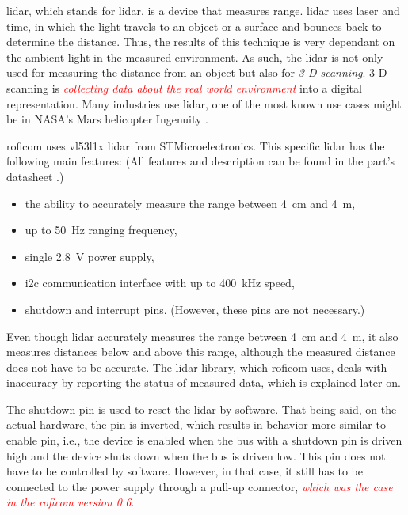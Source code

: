 \documentclass[
  digital,     %
  oneside,     %
  nosansbold,  %
  nocolorbold, %
  lof,         %
  lot,         %
]{fithesis4}
\newcommand{\TODO}[1]{\textcolor{red}{\textit{#1}}}
\begin{document}
\acrshort{lidar}, which stands for \acrlong{lidar}, is a device that measures range. \acrshort{lidar} uses laser and time, in which the light travels to an object or a surface and bounces back to determine the distance. Thus, the results of this technique is very dependant on the ambient light in the measured environment. As such, the \acrshort{lidar} is not only used for measuring the distance from an object but also for \emph{3-D scanning}. 3-D scanning is \TODO{collecting data about the real world environment} into a digital representation. Many industries use \acrshort{lidar}, one of the most known use cases might be in NASA's Mars helicopter Ingenuity \cite{garmin-lidar}.

\acrshort{roficom} uses \gls{vl53l1x} \acrshort{lidar} from STMicroelectronics. This specific \acrshort{lidar} has the following main features: (All features and description can be found in the part's datasheet \cite{vl53l1x}.)

\begin{itemize}
    \item the ability to accurately measure the range between \qty{4}{\centi\metre} and \qty{4}{\metre},
    \item up to \qty{50}{\hertz} ranging frequency,
    \item single \qty{2.8}{\volt} power supply,
    \item \acrshort{i2c} communication interface with up to \qty{400}{\kilo\hertz} speed,
    \item shutdown and interrupt pins. (However, these pins are not necessary.)
\end{itemize}

Even though \acrshort{lidar} accurately measures the range between \qty{4}{\centi\metre} and \qty{4}{\metre}, it also measures distances below and above this range, although the measured distance does not have to be accurate. The lidar library, which \acrshort{roficom} uses, deals with inaccuracy by reporting the status of measured data, which is explained later on.

The shutdown pin is used to reset the \acrshort{lidar} by software. That being said, on the actual hardware, the pin is inverted, which results in behavior more similar to enable pin, i.e., the device is enabled when the bus with a shutdown pin is driven high and the device shuts down when the bus is driven low. This pin does not have to be controlled by software. However, in that case, it still has to be connected to the power supply through a pull-up connector, \TODO{which was the case in the \acrshort{roficom} version 0.6}.
\end{document}
